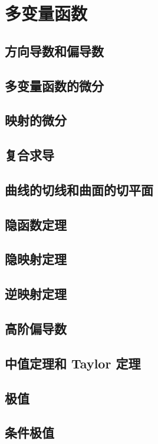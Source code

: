 \documentclass[a4paper, 12pt]{ctexbook}
\begin{document}
    \chapter{多变量函数}
        \section{方向导数和偏导数}
        \section{多变量函数的微分}
        \section{映射的微分}
        \section{复合求导}
        \section{曲线的切线和曲面的切平面}
        \section{隐函数定理}
        \section{隐映射定理}
        \section{逆映射定理}
        \section{高阶偏导数}
        \section{中值定理和 Taylor 定理}
        \section{极值}
        \section{条件极值}
\end{document}
